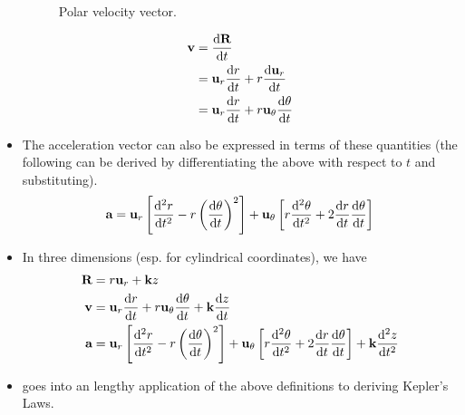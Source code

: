 \documentclass[../main.tex]{subfiles}
\begin{document}
\begin{itemize}
\begin{figure}[h!]
        \caption{Polar velocity vector.}
        \label{fig:polarVelocityVector}
    \end{figure}
    \begin{align*}
        \textbf{v} &= \dv{\textbf{R}}{t}\\
        &= \textbf{u}_r\dv{r}{t}+r\dv{\textbf{u}_r}{t}\\
        &= \textbf{u}_r\dv{r}{t}+r\textbf{u}_\theta\dv{\theta}{t}
    \end{align*}
    \item The acceleration vector can also be expressed in terms of these quantities (the following can be derived by differentiating the above with respect to $t$ and substituting).
    \begin{equation*}
        \textbf{a} = \textbf{u}_r\left[ \dv[2]{r}{t}-r\left( \dv{\theta}{t} \right)^2 \right]+\textbf{u}_\theta\left[ r\dv[2]{\theta}{t}+2\dv{r}{t}\dv{\theta}{t} \right]
    \end{equation*}
    \item In three dimensions (esp. for cylindrical coordinates), we have
    \begin{align*}
        \textbf{R} &= r\textbf{u}_r+\textbf{k}z\\
        \textbf{v} &= \textbf{u}_r\dv{r}{t}+r\textbf{u}_\theta\dv{\theta}{t}+\textbf{k}\dv{z}{t}\\
        \textbf{a} &= \textbf{u}_r\left[ \dv[2]{r}{t}-r\left( \dv{\theta}{t} \right)^2 \right]+\textbf{u}_\theta\left[ r\dv[2]{\theta}{t}+2\dv{r}{t}\dv{\theta}{t} \right]+\textbf{k}\dv[2]{z}{t}
    \end{align*}
    \item \cite{bib:Thomas} goes into an lengthy application of the above definitions to deriving Kepler's Laws.
\end{itemize}
\end{document}
